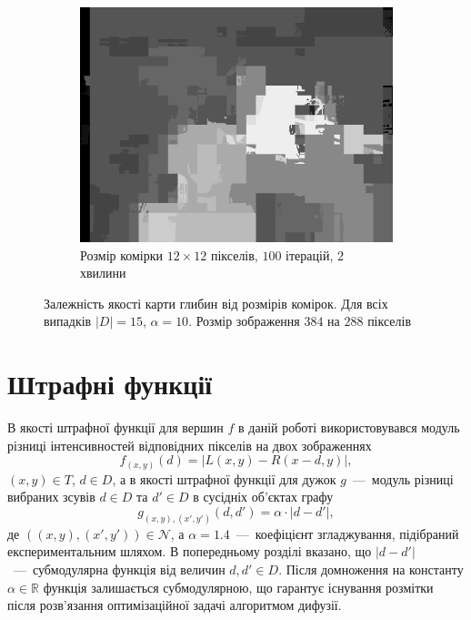 \begin{figure}[h]
\begin{subfigure}[t]{0.32\textwidth}
        \includegraphics[width=\textwidth]{images/tsukuba_superpixel_12}
        \caption{Розмір комірки $12\times 12$ пікселів,
                 $100$ ітерацій,
                 $2$ хвилини}
    \end{subfigure}
    \caption{Залежність якості карти глибин від розмірів комірок.
             Для всіх випадків $\left| D \right| = 15$, $\alpha = 10$.
             Розмір зображення $384$ на $288$ пікселів}
    \label{fig:superpixel:tsukuba:cell:size}
\end{figure}

\section{Штрафні функції}

В якості штрафної функції для вершин $f$
в даній роботі використовувався модуль різниці
інтенсивностей відповідних пікселів на двох зображеннях
\begin{equation*}
    f_{\left(x, y \right)} \left( d \right) =
    \left| L \left(x, y \right) - R \left(x - d, y \right) \right|,
\end{equation*}
$\left(x, y \right) \in T$, $d \in D$,
а в якості штрафної функції для дужок $g$~---~модуль різниці вибраних зсувів
$d \in D$ та $d' \in D$ в сусідніх об'єктах графу
\begin{equation*}
    g_{\left(x, y \right), \left(x', y' \right)} \left(d, d' \right) =
    \alpha \cdot \left| d - d' \right|,
\end{equation*}
де $\left(\left(x, y \right), \left(x', y' \right) \right) \in \mathcal{N}$,
а $\alpha = 1.4$~---~коефіцієнт згладжування,
підібраний експериментальним шляхом.
В попередньому розділі вказано, що
$\left| d - d' \right|$~---~субмодулярна функція від величин
$d, d' \in D$.
Після домноження на константу $\alpha \in \mathbb{R}$
функція залишається субмодулярною,
що гарантує існування розмітки після розв'язання оптимізаційної задачі
алгоритмом дифузії.

